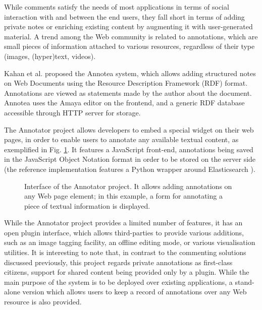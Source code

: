 While comments satisfy the needs of most applications in terms of social
interaction with and between the end users, they fall short in terms of adding
private notes or enriching existing content by augmenting it with
user-generated material. A trend among the Web community is related to
annotations, which are small pieces of information attached to various
resources, regardless of their type (images, (hyper)text, videos).

Kahan et al. \cite{ref:annotea} proposed the Annotea system, which allows
adding structured notes on Web Documents using the Resource Description
Framework (RDF) format. Annotations are viewed as statements made by the author
about the document. Annotea uses the Amaya \cite{ref:amaya} editor on the
frontend, and a generic RDF database accessible through HTTP server for storage.

The Annotator project \cite{ref:annotator} allows developers to embed a special
widget on their web pages, in order to enable users to annotate any available
textual content, as exemplified in Fig. \ref{fig:annotator}.  It features a
JavaScript front-end, annotations being saved in the JavaScript Object Notation
format in order to be stored on the server side (the reference implementation
features a Python wrapper around Elasticsearch \cite{ref:elasearch}).

\begin{figure}[!ht]
  \centering
  \caption[Interface of the Annotator project]
          {Interface of the Annotator project. It allows
           adding annotations on any Web page element; in this example, a form
           for annotating a piece of textual information is displayed.}
  \label{fig:annotator}
\end{figure}

While the Annotator project provides a limited number of features, it has an
open plugin interface, which allows third-parties to provide various additions,
such as an image tagging facility, an offline editing mode, or various
visualisation utilities. It is interesting to note that, in contrast to the
commenting solutions discussed previously, this project regards private
annotations as first-class citizens, support for shared content being provided
only by a plugin. While the main purpose of the system is to be deployed over
existing applications, a stand-alone version which allows users to keep a
record of annotations over any Web resource is also provided.

